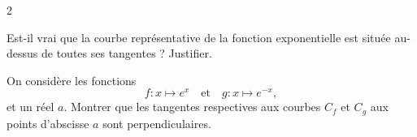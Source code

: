 \documentclass[a4paper,12pt]{article}
\begin{document}
\begin{multicols}{2}
      \begin{exercice}[title=Exercice 14 $\star\star\star$ { [Chercher, Raisonner, Représenter] }]{}{}
      Est-il vrai que la courbe représentative de la fonction exponentielle est située au-dessus de toutes ses tangentes ? Justifier.
      \end{exercice}
      
      \begin{exercice}[title=Exercice 15 $\star\star\star$ { [Chercher, Calculer, Représenter] }]{}{}
      On considère les fonctions  
      \[
      f\colon x\mapsto e^x
      \quad\text{et}\quad
      g\colon x\mapsto e^{-x},
      \]
      et un réel \(a\). Montrer que les tangentes respectives aux courbes \(C_f\) et \(C_g\) aux points d’abscisse \(a\) sont perpendiculaires.
      \end{exercice}
      
\end{multicols}
\end{document}
